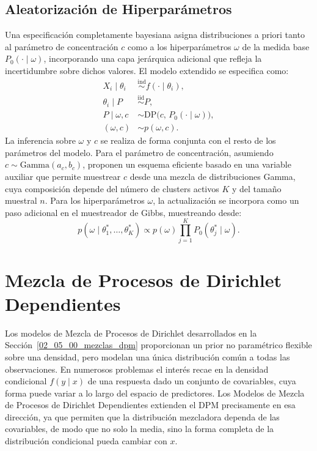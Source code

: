 \subsection{Aleatorización de Hiperparámetros}
\label{02_05_04_hiperparametros}
Una especificación completamente bayesiana asigna distribuciones a priori tanto al parámetro de concentración $c$ como a los hiperparámetros $\omega$ de la medida base $P_0(\cdot \mid \omega)$, incorporando una capa jerárquica adicional que refleja la incertidumbre sobre dichos valores. El modelo extendido se especifica como:
\begin{equation}
\begin{aligned}
    X_i \mid \theta_i &\overset{\mathrm{ind}}{\sim} f(\cdot \mid \theta_i), \\
    \theta_i \mid P &\overset{\mathrm{iid}}{\sim} P, \\
    P \mid \omega, c &\sim \mathrm{DP}\bigl(c,\, P_0(\cdot \mid \omega)\bigr), \\
    (\omega, c) &\sim p(\omega, c).
\end{aligned}
\end{equation}
La inferencia sobre $\omega$ y $c$ se realiza de forma conjunta con el resto de los parámetros del modelo. Para el parámetro de concentración, asumiendo $c \sim \mathrm{Gamma}(a_c, b_c)$, \citet{02_05_escobar1995bayesian} proponen un esquema eficiente basado en una variable auxiliar que permite muestrear $c$ desde una mezcla de distribuciones Gamma, cuya composición depende del número de clusters activos $K$ y del tamaño muestral $n$. Para los hiperparámetros $\omega$, la actualización se incorpora como un paso adicional en el muestreador de Gibbs, muestreando desde:
\begin{equation}
    p(\omega \mid \theta_1^*, \dots, \theta_K^*) \propto
    p(\omega) \prod_{j=1}^{K} P_0(\theta_j^* \mid \omega).
\end{equation}

\section{Mezcla de Procesos de Dirichlet Dependientes}
\label{02_06_00_mezcla_ddp}
Los modelos de Mezcla de Procesos de Dirichlet desarrollados en la Sección~\ref{02_05_00_mezclas_dpm} proporcionan un prior no paramétrico flexible sobre una densidad, pero modelan una única distribución común a todas las observaciones. En numerosos problemas el interés recae en la densidad condicional $f(y \mid x)$ de una respuesta dado un conjunto de covariables, cuya forma puede variar a lo largo del espacio de predictores. Los Modelos de Mezcla de Procesos de Dirichlet Dependientes extienden el DPM precisamente en esa dirección, ya que permiten que la distribución mezcladora dependa de las covariables, de modo que no solo la media, sino la forma completa de la distribución condicional pueda cambiar con $x$.\\

